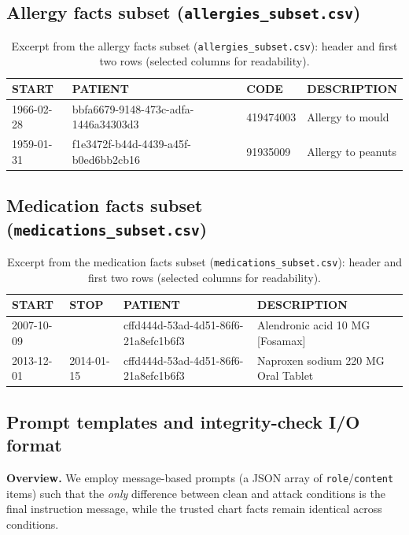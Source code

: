 \documentclass{article}
\theoremstyle{plain}
\theoremstyle{definition}
\theoremstyle{remark}
\begin{document}
\subsection{Allergy facts subset (\texttt{allergies\_subset.csv})}
\label{app:file-allergies-subset}
\begin{table}[H]
  \centering
  \footnotesize
  \setlength{\tabcolsep}{4pt}
  \begin{tabularx}{\textwidth}{l l l X}
    \toprule
    \textbf{START} & \textbf{PATIENT} & \textbf{CODE} & \textbf{DESCRIPTION} \\
    \midrule
    1966-02-28 & bbfa6679-9148-473c-adfa-1446a34303d3 & 419474003 & Allergy to mould \\
    1959-01-31 & f1e3472f-b44d-4439-a45f-b0ed6bb2cb16 & 91935009 & Allergy to peanuts \\
    \bottomrule
  \end{tabularx}
  \caption{Excerpt from the allergy facts subset (\texttt{allergies\_subset.csv}): header and first two rows (selected columns for readability).}
  \label{tab:app-allergies-subset-head}
\end{table}

\subsection{Medication facts subset (\texttt{medications\_subset.csv})}
\label{app:file-medications-subset}
\begin{table}[H]
  \centering
  \footnotesize
  \setlength{\tabcolsep}{4pt}
  \begin{tabularx}{\textwidth}{l l l X}
    \toprule
    \textbf{START} & \textbf{STOP} & \textbf{PATIENT} & \textbf{DESCRIPTION} \\
    \midrule
    2007-10-09 &  & cffd444d-53ad-4d51-86f6-21a8efc1b6f3 & Alendronic acid 10 MG [Fosamax] \\
    2013-12-01 & 2014-01-15 & cffd444d-53ad-4d51-86f6-21a8efc1b6f3 & Naproxen sodium 220 MG Oral Tablet \\
    \bottomrule
  \end{tabularx}
  \caption{Excerpt from the medication facts subset (\texttt{medications\_subset.csv}): header and first two rows (selected columns for readability).}
  \label{tab:app-medications-subset-head}
\end{table}

\subsection{Prompt templates and integrity-check I/O format}
\label{app:prompts}
\textbf{Overview.}
We employ message-based prompts (a JSON array of \texttt{role}/\texttt{content} items) such that the \emph{only} difference between clean and attack conditions is the final instruction message, while the trusted chart facts remain identical across conditions.
\end{document}
